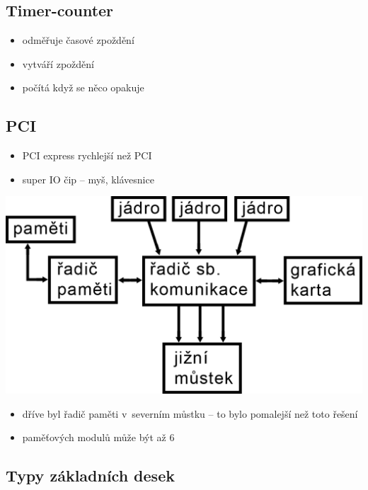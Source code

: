 \documentclass[a4paper,12pt]{article}
\providecommand{\tightlist}{%
\setlength{\itemsep}{0pt}\setlength{\parskip}{0pt}}
\begin{document}
\subsection{Timer-counter}

\begin{itemize}
  \tightlist
  \item odměřuje časové zpoždění
  \item vytváří zpoždění
  \item počítá když se něco opakuje
\end{itemize}
  
\subsection{PCI}
\begin{itemize}
  \tightlist
  \item PCI express rychlejší než PCI
  \item super IO čip -- myš, klávesnice
\end{itemize}

\includegraphics{ref/blokove-schema-procesoru-s-jednim-cipem.png}

\begin{itemize}
  \tightlist
  \item dříve byl řadič paměti v~severním můstku -- to bylo pomalejší než toto řešení
  \item paměťových modulů může být až 6
\end{itemize}

\subsection{Typy základních desek}
\end{document}
